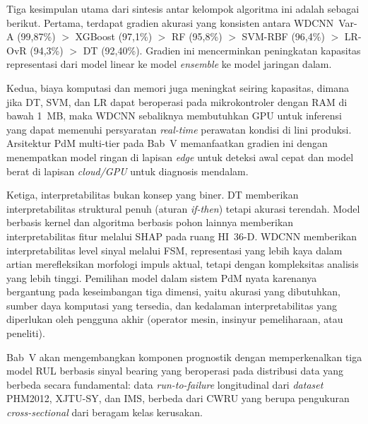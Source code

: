 Tiga kesimpulan utama dari sintesis antar kelompok algoritma ini adalah
sebagai berikut.
Pertama, terdapat gradien akurasi yang konsisten antara WDCNN~Var-A (99,87\%)
$>$ XGBoost (97,1\%) $>$ RF (95,8\%) $>$ SVM-RBF (96,4\%) $>$
LR-OvR (94,3\%) $>$ DT (92,40\%).
Gradien ini mencerminkan peningkatan kapasitas representasi dari model
linear ke model \emph{ensemble} ke model jaringan dalam.

Kedua, biaya komputasi dan memori juga meningkat seiring kapasitas, dimana jika
DT, SVM, dan LR dapat beroperasi pada mikrokontroler dengan RAM di bawah 1~MB, maka
WDCNN sebaliknya membutuhkan GPU untuk inferensi yang dapat memenuhi
persyaratan \emph{real-time} perawatan kondisi di lini produksi.
Arsitektur PdM multi-tier pada Bab~V memanfaatkan gradien ini dengan
menempatkan model ringan di lapisan \emph{edge} untuk deteksi awal cepat
dan model berat di lapisan \emph{cloud/GPU} untuk diagnosis mendalam.

Ketiga, interpretabilitas bukan konsep yang biner.
DT memberikan interpretabilitas struktural penuh (aturan \emph{if-then})
tetapi akurasi terendah.
Model berbasis kernel dan algoritma berbasis pohon lainnya memberikan
interpretabilitas fitur melalui SHAP pada ruang HI~36-D.
WDCNN memberikan interpretabilitas level sinyal melalui FSM, representasi
yang lebih kaya dalam artian merefleksikan morfologi impuls aktual, tetapi
dengan kompleksitas analisis yang lebih tinggi.
Pemilihan model dalam sistem PdM nyata karenanya bergantung pada keseimbangan
tiga dimensi, yaitu akurasi yang dibutuhkan, sumber daya komputasi yang tersedia,
dan kedalaman interpretabilitas yang diperlukan oleh pengguna akhir (operator
mesin, insinyur pemeliharaan, atau peneliti).

Bab~V akan mengembangkan {\color{blue}komponen prognostik} dengan memperkenalkan tiga
model RUL berbasis sinyal bearing yang beroperasi pada distribusi data yang
berbeda secara fundamental: data \emph{run-to-failure} longitudinal dari
\emph{dataset} PHM2012, XJTU-SY, dan IMS, berbeda dari CWRU yang berupa
pengukuran \emph{cross-sectional} dari beragam kelas kerusakan.


